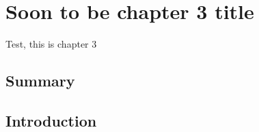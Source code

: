 \chapter{Soon to be chapter 3 title}

 Test, this is chapter 3

\section{Summary}
\section{Introduction}
